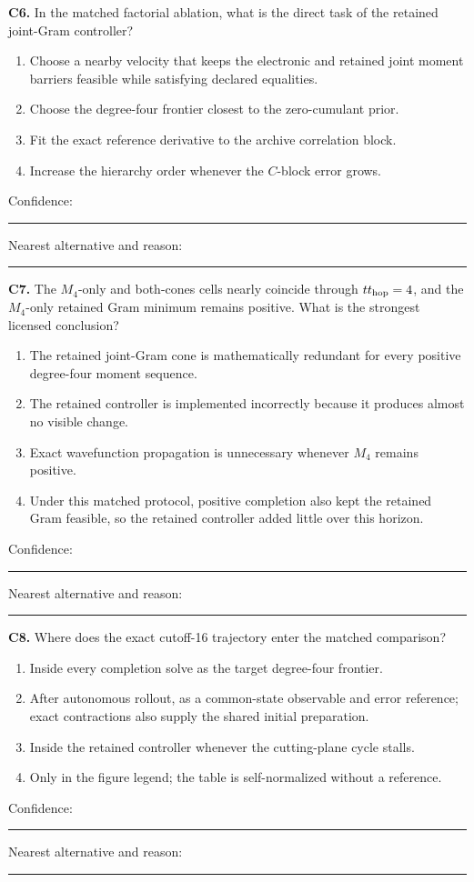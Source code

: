\documentclass[11pt,letterpaper]{article}
\begin{document}
\textbf{C6.} In the matched factorial ablation, what is the direct task of the
retained joint-Gram controller?

\begin{enumerate}[label=\Alph*.]
\item Choose a nearby velocity that keeps the electronic and retained joint
moment barriers feasible while satisfying declared equalities.
\item Choose the degree-four frontier closest to the zero-cumulant prior.
\item Fit the exact reference derivative to the archive correlation block.
\item Increase the hierarchy order whenever the $C$-block error grows.
\end{enumerate}
Confidence: \rule{0.12\textwidth}{0.4pt}\quad
Nearest alternative and reason: \rule{0.40\textwidth}{0.4pt}

\textbf{C7.} The $M_4$-only and both-cones cells nearly coincide through
\(t t_{\rm hop}=4\), and the $M_4$-only retained Gram minimum remains positive.
What is the strongest licensed conclusion?

\begin{enumerate}[label=\Alph*.]
\item The retained joint-Gram cone is mathematically redundant for every
positive degree-four moment sequence.
\item The retained controller is implemented incorrectly because it produces
almost no visible change.
\item Exact wavefunction propagation is unnecessary whenever $M_4$ remains
positive.
\item Under this matched protocol, positive completion also kept the retained
Gram feasible, so the retained controller added little over this horizon.
\end{enumerate}
Confidence: \rule{0.12\textwidth}{0.4pt}\quad
Nearest alternative and reason: \rule{0.40\textwidth}{0.4pt}

\textbf{C8.} Where does the exact cutoff-16 trajectory enter the matched
comparison?

\begin{enumerate}[label=\Alph*.]
\item Inside every completion solve as the target degree-four frontier.
\item After autonomous rollout, as a common-state observable and error
reference; exact contractions also supply the shared initial preparation.
\item Inside the retained controller whenever the cutting-plane cycle stalls.
\item Only in the figure legend; the table is self-normalized without a
reference.
\end{enumerate}
Confidence: \rule{0.12\textwidth}{0.4pt}\quad
Nearest alternative and reason: \rule{0.40\textwidth}{0.4pt}
\end{document}
